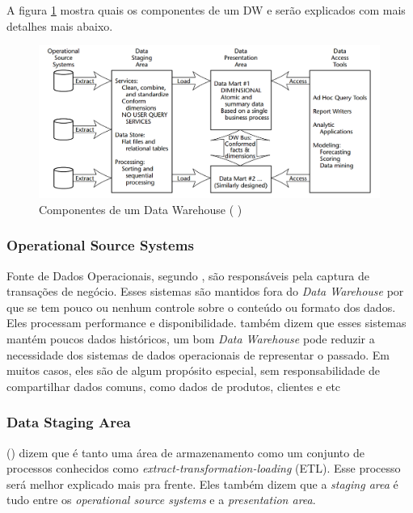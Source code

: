 A figura \ref{fig:dwComponents} mostra quais os componentes de um DW e serão explicados com mais detalhes mais abaixo.
\begin{figure}[H]
\centering
\includegraphics[height=5cm]{imagens/componentes_DW.png}
\caption{Componentes de um Data Warehouse (\citeauthor{kimball2002} \citeyear{kimball2002})}
\label{fig:dwComponents}
\end{figure}

\subsubsection{Operational Source Systems}
Fonte de Dados Operacionais, segundo , são responsáveis pela captura de transações de negócio. Esses sistemas são mantidos fora do \textit{Data Warehouse} por que se tem pouco ou nenhum controle sobre o conteúdo ou formato dos dados. Eles processam performance e disponibilidade.  também dizem que esses sistemas mantém poucos dados históricos, um bom \textit{Data Warehouse} pode reduzir a necessidade dos sistemas de dados operacionais de representar o passado. Em muitos casos, eles são de algum propósito especial, sem responsabilidade de compartilhar dados comuns, como dados de produtos, clientes e etc 

\subsubsection{Data Staging Area}
\citeauthor{kimball2002} (\citeyear{kimball2002}) dizem que é tanto uma área de armazenamento como um conjunto de processos conhecidos como \textit{extract-transformation-loading} (ETL). Esse processo será melhor explicado mais pra frente. Eles também dizem que a \textit{staging area} é tudo entre os \textit{operational source systems} e a \textit{presentation area}. 

